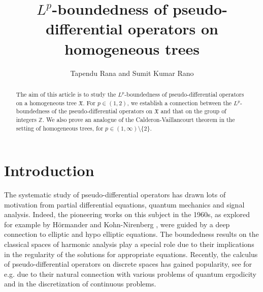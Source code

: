 \documentclass[12pt,reqno]{amsart}
\theoremstyle{definition}
\theoremstyle{definition}
\numberwithin{equation}{section}
\begin{document}
\title{$L^p$-boundedness of pseudo-differential operators on homogeneous trees}
\author{Tapendu Rana and Sumit Kumar Rano}
\address{Tapendu Rana  \endgraf Department of Mathematics,	\endgraf Indian Institute of Technology Bombay, 	\endgraf Powai, Mumbai 400076, Maharashtra, India.} 

\address{Sumit Kumar Rano \endgraf Stat-Math Unit,	\endgraf Indian Statistical Institute,	 B. T. Road, Kolkata 700108, India.}  

	
\begin{abstract}
The aim of this article is to study the $L^{p}$-boundedness of pseudo-differential operators on a homogeneous tree $ \mathfrak{X} $. For $p\in (1,2)$, we establish a connection between the $L^{p}$-boundedness of the pseudo-differential operators on  $ \mathfrak{X} $ and that on the group of integers $\mathbb{Z}$.  We also prove an analogue of the Calderon-Vaillancourt theorem in the setting of homogeneous trees, for $p\in(1,\infty)\setminus\{2\}$.
\end{abstract}
	
\maketitle


\section{Introduction}
The systematic study of pseudo-differential operators has drawn lots of motivation from partial differential equations, quantum mechanics and signal analysis. Indeed, the pioneering works on this subject in the 1960s, as explored for example by H\"ormander \cite{Hormander_1965,Hormander_Ann_1966} and Kohn-Nirenberg \cite{Kohn_Nirenberg_1965}, were guided by a deep connection to elliptic and hypo elliptic equations.  The boundedness results on the classical spaces of harmonic analysis play a special role due to their implications in the regularity of the solutions for appropriate equations. Recently, the calculus of pseudo-differential operators on discrete spaces  has gained popularity, see for e.g. \cite{Botchway_Ruzhansky_2020,Masson_14} due to their natural connection with various problems of quantum ergodicity and in the discretization of continuous problems.
\end{document}

